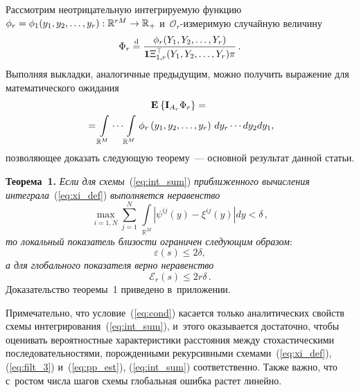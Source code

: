 \begin{multicols}{2}
 Рассмотрим неотрицательную интегрируемую функцию $\phi_r\hm=\phi_1
 (y_1,y_2,\ldots,y_r): \mathbb{R}^{rM} \hm\to \mathbb{R}_+$ и~$\mathcal{O}_r$-из\-ме\-ри\-мую 
 случайную величину
  \begin{equation*}
 \Phi_r \stackrel{\mathrm{d}}{=} \displaystyle\frac{\displaystyle \phi_r(Y_1,Y_2,\ldots,Y_r)\mathstrut}{\displaystyle \mathbf{1}\Xi_{1,r}^{\top}(Y_1,Y_2,\ldots,Y_r)\pi\mathstrut}\,.
 \end{equation*}
 Выполняя выкладки, аналогичные предыдущим, можно получить 
 выражение для математического ожидания
  \begin{multline}
 \mathbf{E}_{  }\left\{ \mathop{\mathbf{I}_{A_r}\Phi_r} \right\} ={}\\
 {}=
 \int\limits_{\mathbb{R}^M}\cdots
 \int\limits_{\mathbb{R}^M}
 \phi_r\left(y_1,y_2, \ldots,y_r\right)\,
 dy_r\cdots dy_2 dy_1,
 \label{eq:me_phi_r}
 \end{multline}
 позволяющее доказать следующую теорему~--- основной результат данной статьи.

\smallskip

\noindent
\textbf{Теорема~1.}
\textit{Если для схемы}~(\ref{eq:int_sum}) 
\textit{приближенного вы\-чис\-ле\-ния интеграла}~(\ref{eq:xi_def}) 
\textit{выполняется неравенство}
  \begin{equation}
 \max\limits_{i=\overline{1,N}}\sum\limits_{j=1}^N \, \int\limits_{\mathbb{R}^M}
 \left\vert \psi^{ij}(y) - \xi^{ij}(y)\right\vert dy < \delta\,,
 \label{eq:cond}
 \end{equation}
\textit{то локальный показатель близости ограничен следующим образом}: 
 \begin{equation}
 \varepsilon(s) \leqslant 2 \delta,
 \label{eq:num_prec_loc}
 \end{equation} 
 \textit{а для глобального показателя верно неравенство}
 \begin{equation}
 \mathcal{E}_r(s) \leqslant 2 r\delta\,.
 \label{eq:num_prec_glob}
 \end{equation} 
 Доказательство теоремы~1 приведено в~приложении.
 
 Примечательно, что условие~(\ref{eq:cond}) касается только аналитических 
 свойств схемы интегрирования~(\ref{eq:int_sum}), и~этого оказывается достаточно, 
 чтобы оценивать вероятностные характеристики расстояния между 
 стохастическими последовательностями, порожденными рекурсивными 
 схемами~(\ref{eq:xi_def}), (\ref{eq:filt_3}) и~(\ref{eq:pp_est}), 
 (\ref{eq:int_sum}) соответственно. Также важно, что с~рос\-том числа 
 шагов схемы глобальная ошибка растет линейно.
  

\end{multicols}
